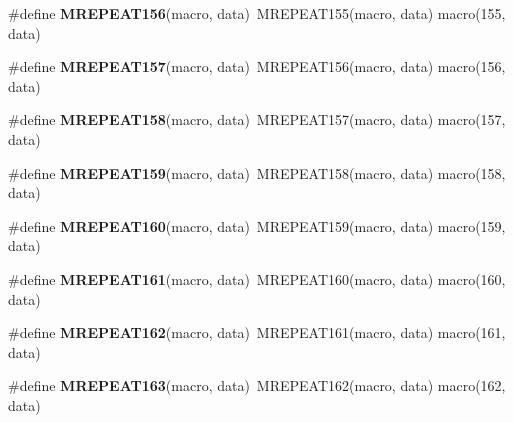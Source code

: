 \begin{DoxyCompactItemize}
\item 
\hypertarget{group__group__sam0__utils__mrepeat_ga4608d896f8fb7879075ba32ad5b687f9}{}\#define {\bfseries M\+R\+E\+P\+E\+A\+T156}(macro,  data)~M\+R\+E\+P\+E\+A\+T155(macro, data)   macro(155, data)\label{group__group__sam0__utils__mrepeat_ga4608d896f8fb7879075ba32ad5b687f9}

\item 
\hypertarget{group__group__sam0__utils__mrepeat_gac6c7099162fd3b9ad60c2e4ff69b6bf1}{}\#define {\bfseries M\+R\+E\+P\+E\+A\+T157}(macro,  data)~M\+R\+E\+P\+E\+A\+T156(macro, data)   macro(156, data)\label{group__group__sam0__utils__mrepeat_gac6c7099162fd3b9ad60c2e4ff69b6bf1}

\item 
\hypertarget{group__group__sam0__utils__mrepeat_ga76360eeb95fe2f07db4e54f3b56c3fef}{}\#define {\bfseries M\+R\+E\+P\+E\+A\+T158}(macro,  data)~M\+R\+E\+P\+E\+A\+T157(macro, data)   macro(157, data)\label{group__group__sam0__utils__mrepeat_ga76360eeb95fe2f07db4e54f3b56c3fef}

\item 
\hypertarget{group__group__sam0__utils__mrepeat_ga0ffc3b60afa702e0588da2e00ddb9e7e}{}\#define {\bfseries M\+R\+E\+P\+E\+A\+T159}(macro,  data)~M\+R\+E\+P\+E\+A\+T158(macro, data)   macro(158, data)\label{group__group__sam0__utils__mrepeat_ga0ffc3b60afa702e0588da2e00ddb9e7e}

\item 
\hypertarget{group__group__sam0__utils__mrepeat_gad1af2da931db2624f37a6357de14bc12}{}\#define {\bfseries M\+R\+E\+P\+E\+A\+T160}(macro,  data)~M\+R\+E\+P\+E\+A\+T159(macro, data)   macro(159, data)\label{group__group__sam0__utils__mrepeat_gad1af2da931db2624f37a6357de14bc12}

\item 
\hypertarget{group__group__sam0__utils__mrepeat_ga8c32111637f7d8420f239a6de681667c}{}\#define {\bfseries M\+R\+E\+P\+E\+A\+T161}(macro,  data)~M\+R\+E\+P\+E\+A\+T160(macro, data)   macro(160, data)\label{group__group__sam0__utils__mrepeat_ga8c32111637f7d8420f239a6de681667c}

\item 
\hypertarget{group__group__sam0__utils__mrepeat_ga24cbd158a09a6694b3578c3332dbe324}{}\#define {\bfseries M\+R\+E\+P\+E\+A\+T162}(macro,  data)~M\+R\+E\+P\+E\+A\+T161(macro, data)   macro(161, data)\label{group__group__sam0__utils__mrepeat_ga24cbd158a09a6694b3578c3332dbe324}

\item 
\hypertarget{group__group__sam0__utils__mrepeat_ga24257587ba592ff6daf20d7ccc16d3a1}{}\#define {\bfseries M\+R\+E\+P\+E\+A\+T163}(macro,  data)~M\+R\+E\+P\+E\+A\+T162(macro, data)   macro(162, data)\label{group__group__sam0__utils__mrepeat_ga24257587ba592ff6daf20d7ccc16d3a1}


\end{DoxyCompactItemize}
